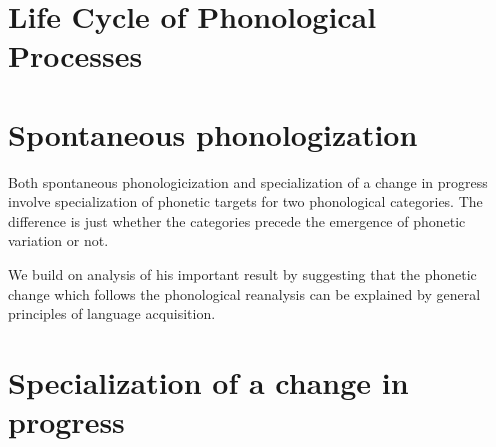 


\section{Life Cycle of Phonological Processes}
\label{trad}



\section{Spontaneous phonologization}
\label{philly}

Both spontaneous phonologicization and specialization of a change in progress involve specialization of phonetic targets for two phonological categories. The difference is just whether the categories precede the emergence of phonetic variation or not.

We build on \citet{fruehwald2013} analysis of his important result by suggesting that the phonetic change which follows the phonological reanalysis can be explained by general principles of language acquisition.

\section{Specialization of a change in progress}
\label{newzea}

